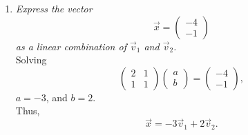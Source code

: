 \documentclass[12pt]{article}
\begin{document}
\begin{enumerate}[label=(\alph*)]
	\item \textit{Express the vector}
	\begin{equation*}
		\vec{x} = \begin{pmatrix} -4 \\ -1 \end{pmatrix}
	\end{equation*}
	\textit{as a linear combination of $\vec{v}_1$ and $\vec{v}_2$.}
	\\[\baselineskip]
	Solving
	\begin{equation*}
		\begin{pmatrix} 2 & 1 \\ 1 & 1 \end{pmatrix}
		\begin{pmatrix} a \\ b \end{pmatrix}
		=
		\begin{pmatrix} -4 \\ -1 \end{pmatrix}
		,
	\end{equation*}
	$a = -3$, and $b = 2$. \\
	Thus,
	\begin{equation*}
		\boxed{
			\vec{x}
			=
			-3 \vec{v}_1 + 2 \vec{v}_2
		}
		.
	\end{equation*}
\end{enumerate}
\newpage
\end{document}
